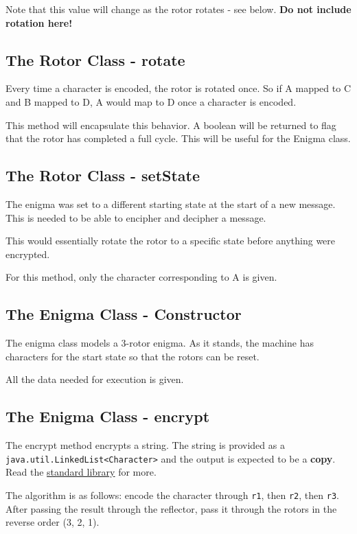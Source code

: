 \documentclass[11pt]{article}
\begin{document}
Note that this value will change as the rotor rotates - see below.
\textbf{Do not include rotation here!}

\subsection{The Rotor Class - rotate}
Every time a character is encoded, the rotor is rotated once. So if A mapped to C and B mapped to D, A would map to D once a character is encoded.

This method will encapsulate this behavior. A boolean will be returned to flag that the rotor has completed a full cycle.
This will be useful for the Enigma class.

\subsection{The Rotor Class - setState}
The enigma was set to a different starting state at the start of a new message.
This is needed to be able to encipher and decipher a message.

This would essentially rotate the rotor to a specific state before anything were encrypted.

For this method, only the character corresponding to A is given.

\subsection{The Enigma Class - Constructor}
The enigma class models a 3-rotor enigma. As it stands, the
machine has characters for the start state so that the rotors can be
reset.

All the data needed for execution is given.

\subsection{The Enigma Class - encrypt}
The encrypt method encrypts a string. The string is provided as a
\texttt{java.util.LinkedList<Character>} and the output
is expected to be a \textbf{copy}. Read the \href{http://docs.oracle.com/javase/7/docs/api/java/util/LinkedList.html?is-external=true}{standard library} for more.

The algorithm is as follows: encode the character through \texttt{r1}, then \texttt{r2}, then \texttt{r3}. After passing the result through
the reflector, pass it through the rotors in the reverse order (3, 2, 1).
\end{document}
